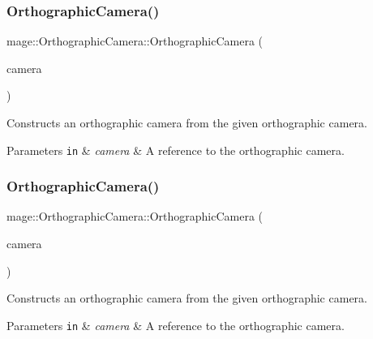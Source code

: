 \subsubsection{\texorpdfstring{Orthographic\+Camera()}{OrthographicCamera()}\hspace{0.1cm}{\footnotesize\ttfamily [2/3]}}
{\footnotesize\ttfamily mage\+::\+Orthographic\+Camera\+::\+Orthographic\+Camera (\begin{DoxyParamCaption}\item[{const \hyperlink{classmage_1_1_orthographic_camera}{Orthographic\+Camera} \&}]{camera }\end{DoxyParamCaption})\hspace{0.3cm}{\ttfamily [private]}}

Constructs an orthographic camera from the given orthographic camera.


\begin{DoxyParams}[1]{Parameters}
\mbox{\tt in}  & {\em camera} & A reference to the orthographic camera. \\
\hline
\end{DoxyParams}
\hypertarget{classmage_1_1_orthographic_camera_ac7b6bd4cb086403e130e5deaaa16046d}{}\label{classmage_1_1_orthographic_camera_ac7b6bd4cb086403e130e5deaaa16046d} 
\subsubsection{\texorpdfstring{Orthographic\+Camera()}{OrthographicCamera()}\hspace{0.1cm}{\footnotesize\ttfamily [3/3]}}
{\footnotesize\ttfamily mage\+::\+Orthographic\+Camera\+::\+Orthographic\+Camera (\begin{DoxyParamCaption}\item[{\hyperlink{classmage_1_1_orthographic_camera}{Orthographic\+Camera} \&\&}]{camera }\end{DoxyParamCaption})\hspace{0.3cm}{\ttfamily [private]}}

Constructs an orthographic camera from the given orthographic camera.


\begin{DoxyParams}[1]{Parameters}
\mbox{\tt in}  & {\em camera} & A reference to the orthographic camera. \\
\hline
\end{DoxyParams}
\hypertarget{classmage_1_1_orthographic_camera_abdad923634e17f217ba975a9149f6c57}{}\label{classmage_1_1_orthographic_camera_abdad923634e17f217ba975a9149f6c57} 
